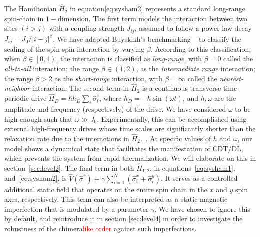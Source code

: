 \documentclass[12pt]{iopart}
\newcommand{\red}[1]{\textcolor{red}{#1}}
\begin{document}
The Hamiltonian $\hat{H}_2$ in equation\eqref{eq:sysham2} represents a standard long-range spin-chain in $1-$dimension. The first term models the interaction between two sites $(i>j)$ with a coupling strength $J_{ij}$, assumed to follow a power-law decay $J_{ij}={J_0}/{|i-j|^\beta}$. We have adapted Buyskikh's benchmarking ~\cite{buyskikh_entanglement_2016} to classify the scaling of the spin-spin interaction by varying $\beta$. According to this classification, when $\beta\in\left[0,1\right)$, the interaction is classified as \textit{long-range}, with $\beta=0$ called the \textit{all-to-all} interaction; the range $\beta\in \left(1,2\right)$, as the \textit{ intermediate range} interaction; the range $\beta > 2$ as the \textit{ short-range} interaction, with $\beta= \infty$ called the \textit{ nearest-neighbor} interaction. The second term in $\hat{H}_2$ is a continuous transverse time-periodic drive $\displaystyle \hat{H}_D=\hbar h_D \sum_i\hat{\sigma}^z_i$, where $\displaystyle h_D = -h\sin{(\omega t)}$, and $h,\omega$ are the amplitude and frequency (respectively) of the drive. We have considered $\omega$ to be high enough such that $\omega\gg J_0$. 	Experimentally, this can be accomplished using external high-frequency drives whose time scales are significantly shorter than the relaxation rate due to the interactions in $\hat{H}_2$.~\cite{choi_observation_2017,zhang_observation_2017,Cirac_1995,Blatt_2012}. At specific values of $h$ and $\omega$, our model shows a dynamical state that facilitates the manifestation of CDT/DL, which prevents the system from rapid thermalization. We will elaborate on this in section~\ref{sec:level2}. The final term in both $\hat{H}_{1,2}$, in equations~\eqref{eq:sysham1}, and~\eqref{eq:sysham2}, is $\displaystyle \hat{V}(\hat{\sigma}^{\gamma}) \equiv\gamma  \sum_{i=1}^{N} (\hat{\sigma}^x_i + \hat{\sigma}^y_i)$. It serves as a controlled additional static field that operates on the entire spin chain in the $x$ and $y$ spin axes, respectively.  This term can also be interpreted as a static magnetic imperfection that is modulated by a parameter $\gamma$. We have chosen to ignore this by default, and reintroduce it in section \ref{sec:level4} in order to investigate the robustness of the chimera\red{like order} against such imperfections.
\end{document}
